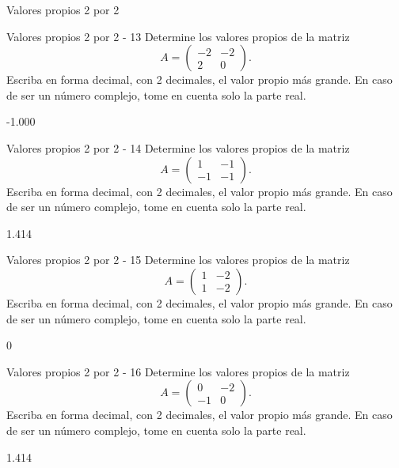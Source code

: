\documentclass[a4,11pt]{aleph-notas}
\begin{document}
\begin{quiz}{Valores propios 2 por 2}
\begin{numerical}[tolerance=0.01]%
    {Valores propios 2 por 2 - 13}
    Determine los valores propios de la matriz
    \[
    A = \begin{pmatrix}
    -2 & -2 \\
    2 & 0
    \end{pmatrix}.
    \]
    Escriba en forma decimal, con 2 decimales, el valor propio más grande. En caso de ser un número complejo, tome en cuenta solo la parte real.
    \item[] -1.000
\end{numerical}

\begin{numerical}[tolerance=0.01]%
    {Valores propios 2 por 2 - 14}
    Determine los valores propios de la matriz
    \[
    A = \begin{pmatrix}
    1 & -1 \\
    -1 & -1
    \end{pmatrix}.
    \]
    Escriba en forma decimal, con 2 decimales, el valor propio más grande. En caso de ser un número complejo, tome en cuenta solo la parte real.
    \item[] 1.414
\end{numerical}

\begin{numerical}[tolerance=0.01]%
    {Valores propios 2 por 2 - 15}
    Determine los valores propios de la matriz
    \[
    A = \begin{pmatrix}
    1 & -2 \\
    1 & -2
    \end{pmatrix}.
    \]
    Escriba en forma decimal, con 2 decimales, el valor propio más grande. En caso de ser un número complejo, tome en cuenta solo la parte real.
    \item[] 0
\end{numerical}

\begin{numerical}[tolerance=0.01]%
    {Valores propios 2 por 2 - 16}
    Determine los valores propios de la matriz
    \[
    A = \begin{pmatrix}
    0 & -2 \\
    -1 & 0
    \end{pmatrix}.
    \]
    Escriba en forma decimal, con 2 decimales, el valor propio más grande. En caso de ser un número complejo, tome en cuenta solo la parte real.
    \item[] 1.414
\end{numerical}


\end{quiz}
\end{document}
